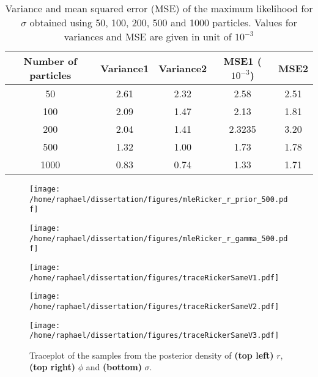 \documentclass{article}
\newcommand{\ra}[1]{\renewcommand{\arraystretch}{#1}}
\begin{document}
	\begin{table}[htb]
		\centering
		\ra{1.3}
		\begin{tabular}{@{}ccccc@{}} \toprule
			Number of particles & Variance1 &  Variance2 & MSE1 ($10^{-3}$)& MSE2\\ \midrule
			50 & 2.61 & 2.32 & 2.58 & 2.51\\
			100 & 2.09 & 1.47 & 2.13 & 1.81\\
			200 & 2.04 & 1.41 &  2.3235  & 3.20\\ 
			500 & 1.32 & 1.00 & 1.73 & 1.78\\
			1000 & 0.83 & 0.74 & 1.33 & 1.71 \\  \bottomrule
		\end{tabular}
		\caption{Variance and mean squared error (MSE) of the maximum likelihood for $\sigma$ obtained using 50, 100, 200, 500 and 1000 particles. Values for variances and MSE are given in unit of $10^{-3}$}
		\label{table:mleSigma}
	\end{table}

	\begin{figure}[htb]
		\centering
		\begin{minipage}{0.4\textwidth}
			\centering
			\texttt{[image: /home/raphael/dissertation/figures/mleRicker\_r\_prior\_500.pdf]}
		\end{minipage}
		\begin{minipage}{0.4\textwidth}
			\centering
			\texttt{[image: /home/raphael/dissertation/figures/mleRicker\_r\_gamma\_500.pdf]}
		\end{minipage}
		\caption{}
		\label{fig:comparisonR}
	\end{figure}
	
	\begin{figure}[htb]
		\centering
		\begin{minipage}{0.4\textwidth}
			\centering
			\texttt{[image: /home/raphael/dissertation/figures/traceRickerSameV1.pdf]}
		\end{minipage}
		\begin{minipage}{0.4\textwidth}
			\centering
			\texttt{[image: /home/raphael/dissertation/figures/traceRickerSameV2.pdf]}
		\end{minipage}
		\begin{minipage}{0.4\textwidth}
			\centering
			\texttt{[image: /home/raphael/dissertation/figures/traceRickerSameV3.pdf]}
		\end{minipage}
		\caption{Traceplot of the samples from the posterior density of \textbf{(top left)} $r$, \textbf{(top right)} $\phi$ and \textbf{(bottom)} $\sigma$.}
		\label{fig:traceplotDiag}
	\end{figure}
	
\end{document}
